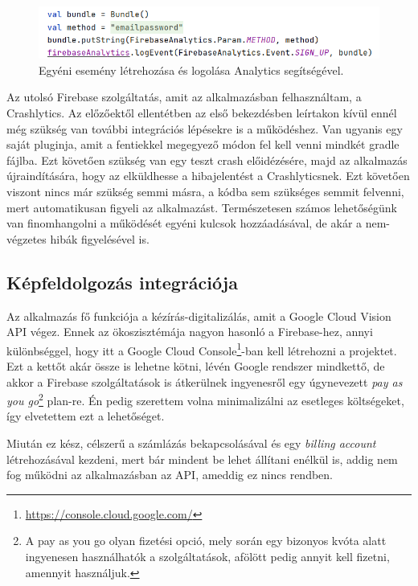 \begin{figure}[!ht]
	\centering
	\includegraphics[width=120mm, keepaspectratio]{figures/analytics_custom.png}
	\caption{Egyéni esemény létrehozása és logolása Analytics segítségével.}
	\label{fig:Analytics}
\end{figure}

Az utolsó Firebase szolgáltatás, amit az alkalmazásban felhasználtam, a Crashlytics. Az előzőektől ellentétben az első bekezdésben leírtakon kívül ennél még szükség van további integrációs lépésekre is a működéshez. Van ugyanis egy saját pluginja, amit a fentiekkel megegyező módon fel kell venni mindkét gradle fájlba. Ezt követően szükség van egy teszt crash előidézésére, majd az alkalmazás újraindítására, hogy az elküldhesse a hibajelentést a Crashlyticsnek. Ezt követően viszont nincs már szükség semmi másra, a kódba sem szükséges semmit felvenni, mert automatikusan figyeli az alkalmazást. Természetesen számos lehetőségünk van finomhangolni a működését egyéni kulcsok hozzáadásával, de akár a nem-végzetes hibák figyelésével is.

\subsection{Képfeldolgozás integrációja}
Az alkalmazás fő funkciója a kézírás-digitalizálás, amit a Google Cloud Vision API végez. Ennek az ökoszisztémája nagyon hasonló a Firebase-hez, annyi különbséggel, hogy itt a Google Cloud Console\footnote{\url{https://console.cloud.google.com/}}-ban kell létrehozni a projektet. Ezt a kettőt akár össze is lehetne kötni, lévén Google rendszer mindkettő, de akkor a Firebase szolgáltatások is átkerülnek ingyenesről egy úgynevezett \emph{pay as you go}\footnote{A pay as you go olyan fizetési opció, mely során egy bizonyos kvóta alatt ingyenesen használhatók a szolgáltatások, afölött pedig annyit kell fizetni, amennyit használjuk.} plan-re. Én pedig szerettem volna minimalizálni az esetleges költségeket, így elvetettem ezt a lehetőséget.
	
Miután ez kész, célszerű a számlázás bekapcsolásával és egy \emph{billing account} létrehozásával kezdeni, mert bár mindent be lehet állítani enélkül is, addig nem fog működni az alkalmazásban az API, ameddig ez nincs rendben. 

